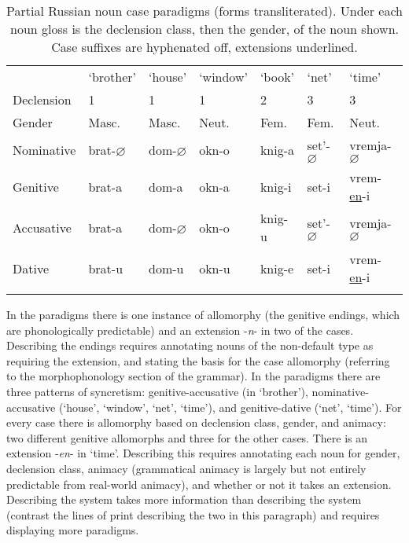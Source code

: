 \documentclass[output=paper,hidelinks]{langscibook}
\begin{document}
\begin{table}
\caption{Partial Russian noun case paradigms (forms transliterated).  Under each noun gloss is the declension class, then the gender, of the noun shown.  Case suffixes are hyphenated off, extensions underlined.\label{tab2}}
\begin{tabularx}{\textwidth}{Xllllll}
\lsptoprule
			 & ‘brother’ & ‘house’ & ‘window’ & ‘book’ & ‘net’ & ‘time’ \\
Declension   & 1		 & 1	   & 1		  & 2	   & 3	   & 3	 \\
Gender		 & Masc.     & Masc.   & Neut.	  & Fem.   & Fem.  & Neut. \\
\midrule
Nominative 	 & brat-$\varnothing$  & dom-$\varnothing$ & okn-o & knig-a & set'-$\varnothing$ & vremja-$\varnothing$ \\
Genitive 	 & brat-a & dom-a & okn-a & knig-i & set-i & vrem-\uline{en}-i \\
Accusative 	 & brat-a & dom-$\varnothing$ & okn-o & knig-u & set'-$\varnothing$ & vremja-$\varnothing$ \\
Dative		 & brat-u & dom-u & okn-u & knig-e & set-i & vrem-\uline{en}-i \\
 \lspbottomrule
\end{tabularx}
\end{table}
 
In the  paradigms there is one instance of allomorphy (the genitive endings, which are phonologically predictable) and an extension -\textit{n}- in two of the cases.  Describing the endings requires annotating nouns of the non-default type as requiring the extension, and stating the basis for the case allomorphy (referring to the morphophonology section of the grammar).  In the  paradigms there are three patterns of syncretism:  genitive-accusative (in ‘brother’), nom\-i\-na\-tive-ac\-cusative (‘house’, ‘window’, ‘net’, ‘time’), and genitive-dative (‘net’, ‘time’).  For every case there is allomorphy based on declension class, gender, and animacy: two different genitive allomorphs and three for the other cases.  There is an extension -\textit{en}- in ‘time’.  Describing this requires annotating each noun for gender, declension class, animacy (grammatical animacy is largely but not entirely predictable from real-world animacy), and whether or not it takes an extension.  Describing the  system takes more information than describing the  system (contrast the lines of print describing the two in this paragraph) and requires displaying more paradigms. 
 
\end{document}
